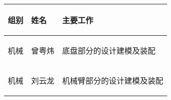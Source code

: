 
\begin{longtable}{ p{2cm} | p{3.5cm} | p{9.3cm} |}

    \hline

    \endfoot
    
    \rowcolor{tabhdcolor}

        \begin{center}
            组别
        \end{center} &
        \begin{center}
            姓名
        \end{center} &
        \begin{center}
            主要工作
        \end{center} \\

    \hline

    \endhead

        \begin{center}
            机械
        \end{center} &
        \begin{center}
            曾粤炜
        \end{center} &
        \begin{center}
            底盘部分的设计建模及装配
        \end{center}  \\
        
    \hline
        \begin{center}
            机械
        \end{center}&
        \begin{center}
            刘云龙
        \end{center}&
        \begin{center}
            机械臂部分的设计建模及装配
        \end{center}\\


\end{longtable}
